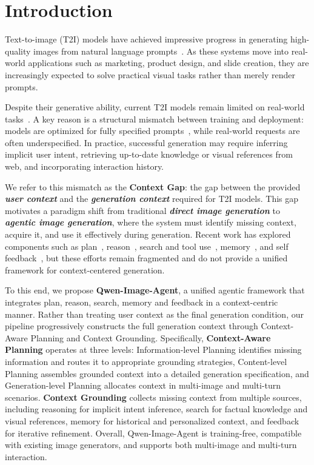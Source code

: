 \section{Introduction}

Text-to-image (T2I) models have achieved impressive progress in generating high-quality images from natural language prompts~\citep{flux2024, sd35Medium, Wu2025QwenImageTR}. As these systems move into real-world applications such as marketing, product design, and slide creation, they are increasingly expected to solve practical visual tasks rather than merely render prompts.

Despite their generative ability, current T2I models remain limited on real-world tasks~\citep{He2026MindBrushIA}. A key reason is a structural mismatch between training and deployment: models are optimized for fully specified prompts~\citep{Wu2025QwenImageTR}, while real-world requests are often underspecified. In practice, successful generation may require inferring implicit user intent, retrieving up-to-date knowledge or visual references from web, and incorporating interaction history.

We refer to this mismatch as the \textbf{Context Gap}: the gap between the provided \textbf{\textit{user context}} and the \textbf{\textit{generation context}} required for T2I models. This gap motivates a paradigm shift from traditional \textbf{\textit{direct image generation}} to \textbf{\textit{agentic image generation}}, where the system must identify missing context, acquire it, and use it effectively during generation. Recent work has explored components such as plan~\citep{Yao2026PhotoAgentAP}, reason~\citep{He2026MindBrushIA}, search and tool use~\citep{Ye2026AgentBH,Feng2026GenSearcherRA,He2026MindBrushIA}, memory~\citep{He2026GEMSAM}, and self feedback~\citep{Jiang2026GenAgentST,Wang2025ImAgentAU}, but these efforts remain fragmented and do not provide a unified framework for context-centered generation.

To this end, we propose \textbf{Qwen-Image-Agent}, a unified agentic framework that integrates plan, reason, search, memory and feedback in a context-centric manner. Rather than treating user context as the final generation condition, our pipeline progressively constructs the full generation context through Context-Aware Planning and Context Grounding. Specifically, \textbf{Context-Aware Planning} operates at three levels: Information-level Planning identifies missing information and routes it to appropriate grounding strategies, Content-level Planning assembles grounded context into a detailed generation specification, and Generation-level Planning allocates context in multi-image and multi-turn scenarios. \textbf{Context Grounding} collects missing context from multiple sources, including reasoning for implicit intent inference, search for factual knowledge and visual references, memory for historical and personalized context, and feedback for iterative refinement. Overall, Qwen-Image-Agent is training-free, compatible with existing image generators, and supports both multi-image and multi-turn interaction.

